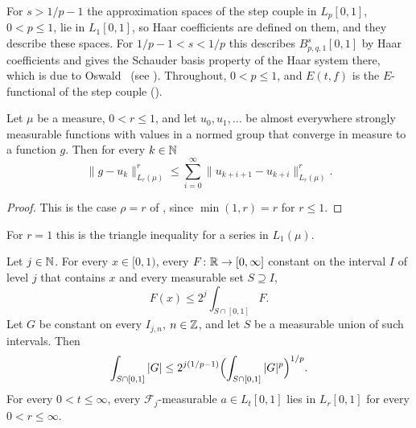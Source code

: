 For $s > 1/p - 1$ the approximation spaces of the step couple in $L_p[0, 1]$, $0 < p \leq 1$, lie
in $L_1[0, 1]$, so Haar coefficients are defined on them, and they describe these spaces. For
$1/p - 1 < s < 1/p$ this describes $B^s_{p,q,1}[0, 1]$ by Haar coefficients and gives the
Schauder basis property of the Haar system there, which is due to Oswald~\cite{Oswald1981} (see
\cite[\S1 and Theorem~1]{Oswald2018}). Throughout, $0 < p \leq 1$, and $E(t, f)$ is the
$E$-functional of the step couple ().

\begin{lemma}
\label{lem:telescoping-fatou}
\leanok
Let $\mu$ be a measure, $0 < r \leq 1$, and let $u_0, u_1, \dots$ be almost everywhere strongly
measurable functions with values in a normed group that converge in measure to a function $g$.
Then for every $k \in \mathbb{N}$
\[
  \|g - u_k\|_{L_r(\mu)}^r \leq \sum_{i=0}^\infty \|u_{k+i+1} - u_{k+i}\|_{L_r(\mu)}^r .
\]
\end{lemma}

\begin{proof}
\leanok
{}
This is the case $\rho = r$ of , since $\min(1, r) = r$ for
$r \leq 1$.
\end{proof}

For $r = 1$ this is the triangle inequality for a series in $L_1(\mu)$.

\begin{lemma}[Steps in $L_1$]
\label{lem:steps-into-l1}
\leanok
{}
Let $j \in \mathbb{N}$. For every $x \in [0, 1)$, every $F \colon \mathbb{R} \to [0, \infty]$ constant on the
interval $I$ of level $j$ that contains $x$ and every measurable set $S \supseteq I$,
\[
  F(x) \leq 2^j \int_{S \cap [0, 1]} F .
\]
Let $G$ be constant on every $I_{j,n}$, $n \in \mathbb{Z}$, and let $S$ be a measurable union of such
intervals. Then
\[
  \int_{S \cap [0, 1]} |G| \leq 2^{j(1/p - 1)} \Bigl( \int_{S \cap [0, 1]} |G|^p \Bigr)^{1/p} .
\]
For every $0 < t \leq \infty$, every $\mathcal{F}_j$-measurable $a \in L_t[0, 1]$ lies in
$L_r[0, 1]$ for every $0 < r \leq \infty$.
\end{lemma}

